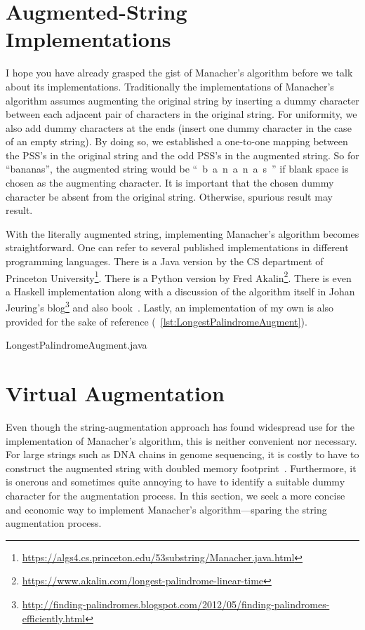 \section{Augmented-String Implementations}\label{sec:implementation-lps-augmented}

I hope you have already grasped the gist of Manacher's algorithm before we talk about its
implementations.
Traditionally the implementations of Manacher's algorithm assumes augmenting the original string
by inserting a dummy character between each adjacent pair of characters in the
original string.
For uniformity, we also add dummy characters at the ends (insert one dummy
character in the case of an empty string).
By doing so, we established a one-to-one mapping between the PSS's in the original string
and the odd PSS's in the augmented string.
So for \mbox{``bananas''}, the augmented string would be \mbox{`` b a n a n a s ''}
if blank space is chosen as the augmenting character.
It is important that the chosen dummy character be absent from the original string.
Otherwise, spurious result may result.


With the literally augmented string, implementing Manacher's algorithm becomes straightforward.
One can refer to several published implementations in different programming languages.
There is a Java version by the CS department of Princeton
University\footnote{\url{https://algs4.cs.princeton.edu/53substring/Manacher.java.html}}.
There is a Python version by Fred
Akalin\footnote{\url{https://www.akalin.com/longest-palindrome-linear-time}}.
There is even a Haskell implementation along with a discussion of the algorithm itself
in Johan Jeuring's blog\footnote{
\url{http://finding-palindromes.blogspot.com/2012/05/finding-palindromes-efficiently.html}} and
also book~\cite{jeuring1993theories}.
Lastly, an implementation of my own is also provided for the sake of reference
(~\autoref{lst:LongestPalindromeAugment}).


{LongestPalindromeAugment.java}


\section{Virtual Augmentation}\label{sec:virtualMapping}

Even though the string-augmentation approach has found widespread use for
the implementation of Manacher's algorithm, this is neither convenient nor necessary.
For large strings such as DNA chains in genome sequencing, it is costly to have to
construct the augmented string with doubled memory footprint~\cite{shiu2010data}.
Furthermore, it is onerous and sometimes quite annoying to have to identify a suitable dummy
character for the augmentation process.
In this section, we seek a more concise and economic way to
implement Manacher's algorithm---sparing the string augmentation process.


